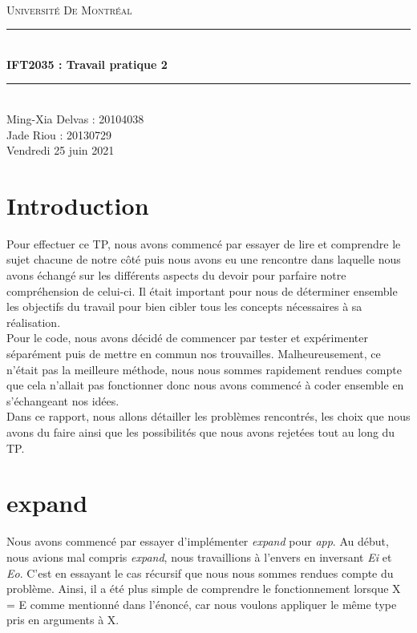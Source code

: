 \documentclass{article}
\begin{document}
\begin{titlepage}
\newcommand{\HRule}{\rule{\linewidth}{0.5mm}}
\center
\noindent\\[5cm]
\textsc{\LARGE Université De Montréal} \\[1cm]
\HRule \\[0.4cm]
{ \huge \bfseries IFT2035 : Travail pratique 2 \\[0.15cm] }
\HRule \\[1.5cm]
Ming-Xia Delvas : 20104038 \\
Jade Riou : 20130729
\\[1cm]
Vendredi 25 juin 2021
\end{titlepage}

\newpage
\section{Introduction}
Pour effectuer ce TP, nous avons commencé par essayer de lire et comprendre le sujet chacune de notre côté puis nous avons eu une rencontre dans laquelle nous avons échangé sur les différents aspects du devoir pour parfaire notre compréhension de celui-ci. Il était important pour nous de déterminer ensemble les objectifs du travail pour bien cibler tous les concepts nécessaires à sa réalisation.\\

Pour le code, nous avons décidé de commencer par tester et expérimenter séparément puis de mettre en commun nos trouvailles. Malheureusement, ce n'était pas la meilleure méthode, nous nous sommes rapidement rendues compte que cela n'allait pas fonctionner donc nous avons commencé à coder ensemble en s'échangeant nos idées.\\

Dans ce rapport, nous allons détailler les problèmes rencontrés, les choix que nous avons du faire ainsi que les possibilités que nous avons rejetées tout au long du TP.

\section{expand}
Nous avons commencé par essayer d'implémenter \textit{expand} pour \textit{app}. Au début, nous avions mal compris \textit{expand}, nous travaillions à l'envers en inversant \textit{Ei} et \textit{Eo}. C'est en essayant le cas récursif que nous nous sommes rendues compte du problème. Ainsi, il a été plus simple de comprendre le fonctionnement lorsque X = E comme mentionné dans l'énoncé, car nous voulons appliquer le même type pris en arguments à X.\\
\end{document}
